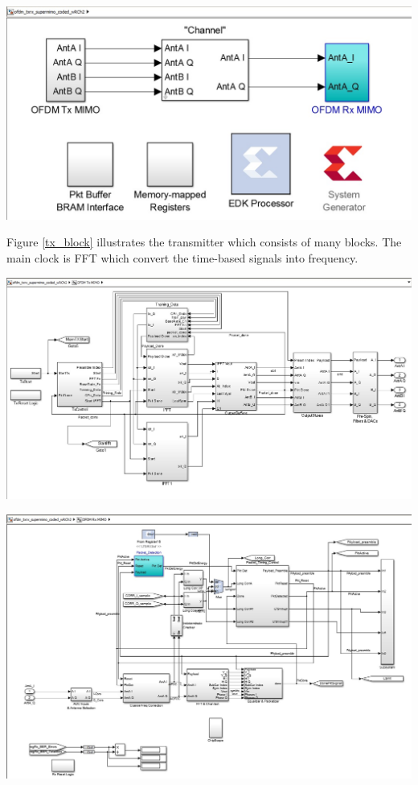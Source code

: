 \begin{center}
\includegraphics[width=\textwidth]{content/fig/system.JPG}
\label{ofdm_system}
\end{center}

Figure \ref{tx_block} illustrates the transmitter which consists of many blocks. The main clock is FFT which convert the time-based signals into frequency.\\


\begin{center}
\includegraphics[width=\textwidth]{content/fig/txblock.JPG}
\label{tx_block}
\end{center}

\begin{center}
\includegraphics[width=\textwidth]{content/fig/rxblock.JPG}
\label{rx_block}
\end{center}

